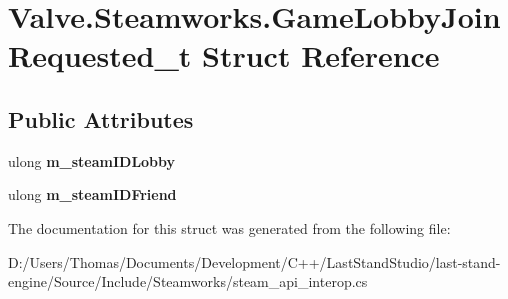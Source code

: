 \hypertarget{structValve_1_1Steamworks_1_1GameLobbyJoinRequested__t}{}\section{Valve.\+Steamworks.\+Game\+Lobby\+Join\+Requested\+\_\+t Struct Reference}
\label{structValve_1_1Steamworks_1_1GameLobbyJoinRequested__t}
\subsection*{Public Attributes}
\begin{DoxyCompactItemize}
\item 
\hypertarget{structValve_1_1Steamworks_1_1GameLobbyJoinRequested__t_a780f85949e5790a199d1068d0f69185c}{}ulong {\bfseries m\+\_\+steam\+I\+D\+Lobby}\label{structValve_1_1Steamworks_1_1GameLobbyJoinRequested__t_a780f85949e5790a199d1068d0f69185c}

\item 
\hypertarget{structValve_1_1Steamworks_1_1GameLobbyJoinRequested__t_af5a683b86e9be0936e75567ce0fbeadb}{}ulong {\bfseries m\+\_\+steam\+I\+D\+Friend}\label{structValve_1_1Steamworks_1_1GameLobbyJoinRequested__t_af5a683b86e9be0936e75567ce0fbeadb}

\end{DoxyCompactItemize}


The documentation for this struct was generated from the following file\+:\begin{DoxyCompactItemize}
\item 
D\+:/\+Users/\+Thomas/\+Documents/\+Development/\+C++/\+Last\+Stand\+Studio/last-\/stand-\/engine/\+Source/\+Include/\+Steamworks/steam\+\_\+api\+\_\+interop.\+cs\end{DoxyCompactItemize}
